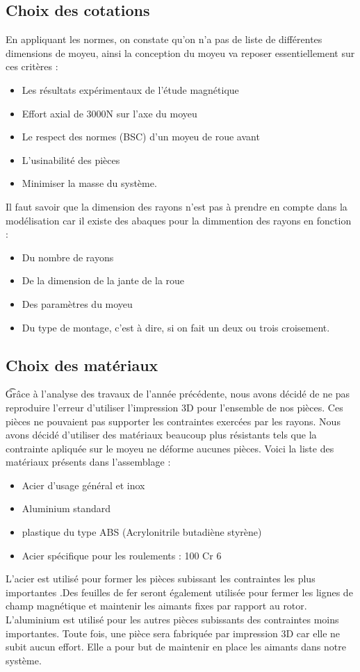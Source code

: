 \documentclass[a4paper,12pt]{article} %
\begin{document}
\subsection{Choix des cotations}
En appliquant les normes, on constate qu'on n'a pas de liste de différentes dimensions de moyeu, ainsi la conception du moyeu va reposer essentiellement sur ces critères : 
\begin{itemize}
\item Les résultats expérimentaux de l'étude magnétique
\item Effort axial de 3000N sur l'axe du moyeu
\item Le respect des normes (BSC) d'un moyeu de roue avant 
\item L'usinabilité des pièces
\item Minimiser la masse du système.
\end{itemize}
Il faut savoir que la dimension des rayons n'est pas à prendre en compte dans la modélisation car il existe des abaques pour la dimmention des rayons en fonction :
\begin{itemize}
\item Du nombre de rayons
\item De la dimension de la jante de la roue
\item Des paramètres du moyeu
\item Du type de montage, c'est à dire, si on fait un deux ou trois croisement.
\end{itemize}


\subsection{Choix des matériaux} 
\t Grâce à l'analyse des travaux de l'année précédente, nous avons décidé de ne pas reproduire l'erreur d'utiliser l'impression 3D pour l'ensemble de nos pièces. Ces pièces ne pouvaient pas supporter les contraintes exercées par les rayons. Nous avons décidé d'utiliser des matériaux beaucoup plus résistants tels que la contrainte apliquée sur le moyeu ne déforme aucunes pièces. Voici la liste des matériaux présents dans l'assemblage :
\begin{itemize}
\item Acier d'usage général et inox
\item Aluminium standard
\item plastique du type ABS (Acrylonitrile butadiène styrène)
\item Acier spécifique pour les roulements : 100 Cr 6
\end{itemize}
L'acier est utilisé pour former les pièces subissant les contraintes les plus importantes .Des feuilles de fer seront également utilisée pour fermer les lignes de champ magnétique et maintenir les aimants fixes par rapport au rotor. L'aluminium est utilisé pour les autres pièces subissants des contraintes moins importantes. Toute fois, une pièce sera fabriquée par impression 3D car elle ne subit aucun effort. Elle a pour but de maintenir en place les aimants dans notre système.
\end{document}
